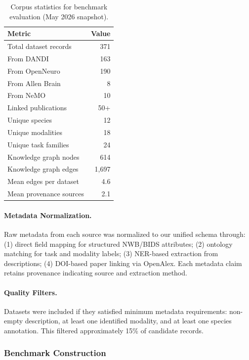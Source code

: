 \documentclass{article}
\theoremstyle{definition}
\begin{document}
\begin{table}[t]
\centering
\small
\caption{Corpus statistics for benchmark evaluation (May 2026 snapshot).}
\label{tab:corpus-stats}
\begin{tabular}{lr}
\toprule
\textbf{Metric} & \textbf{Value} \\
\midrule
Total dataset records & 371 \\
\quad From DANDI & 163 \\
\quad From OpenNeuro & 190 \\
\quad From Allen Brain & 8 \\
\quad From NeMO & 10 \\
Linked publications & 50+ \\
Unique species & 12 \\
Unique modalities & 18 \\
Unique task families & 24 \\
Knowledge graph nodes & 614 \\
Knowledge graph edges & 1,697 \\
Mean edges per dataset & 4.6 \\
Mean provenance sources & 2.1 \\
\bottomrule
\end{tabular}
\end{table}

\paragraph{Metadata Normalization.} Raw metadata from each source was normalized to our unified schema through: (1) direct field mapping for structured NWB/BIDS attributes; (2) ontology matching for task and modality labels; (3) NER-based extraction from descriptions; (4) DOI-based paper linking via OpenAlex. Each metadata claim retains provenance indicating source and extraction method.

\paragraph{Quality Filters.} Datasets were included if they satisfied minimum metadata requirements: non-empty description, at least one identified modality, and at least one species annotation. This filtered approximately 15\% of candidate records.

\subsubsection{Benchmark Construction}
\end{document}
